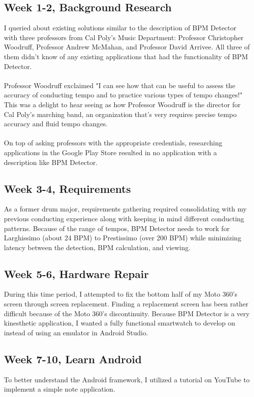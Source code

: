 \documentclass[12pt]{article}
\begin{document}
\subsection{Week 1-2, Background Research}
I queried about existing solutions similar to the description of BPM Detector with three professors from Cal Poly's Music Department: Professor Christopher Woodruff, Professor Andrew McMahan, and Professor David Arrivee. All three of them didn't know of any existing applications that had the functionality of BPM Detector. 
\\
\\
Professor Woodruff exclaimed "I can see how that can be useful to assess the accuracy of conducting tempo and to practice various types of tempo changes!" This was a delight to hear seeing as how Professor Woodruff is the director for Cal Poly's marching band, an organization that's very requires precise tempo accuracy and fluid tempo changes. 
\\
\\
On top of asking professors with the appropriate credentials, researching applications in the Google Play Store resulted in no application with a description like BPM Detector.

\subsection{Week 3-4, Requirements}
As a former drum major, requirements gathering required consolidating with my previous conducting experience along with keeping in mind different conducting patterns. Because of the range of tempos, BPM Detector needs to work for Larghissimo (about 24 BPM) to Prestissimo (over 200 BPM) while minimizing latency between the detection, BPM calculation, and viewing.

\subsection{Week 5-6, Hardware Repair}
During this time period, I attempted to fix the bottom half of my Moto 360's screen through screen replacement. Finding a replacement screen has been rather difficult because of the Moto 360's discontinuity. Because BPM Detector is a very kinesthetic application, I wanted a fully functional smartwatch to develop on instead of using an emulator in Android Studio.

\subsection{Week 7-10, Learn Android}
To better understand the Android framework, I utilized a tutorial on YouTube to implement a simple note application.

\end{document}
